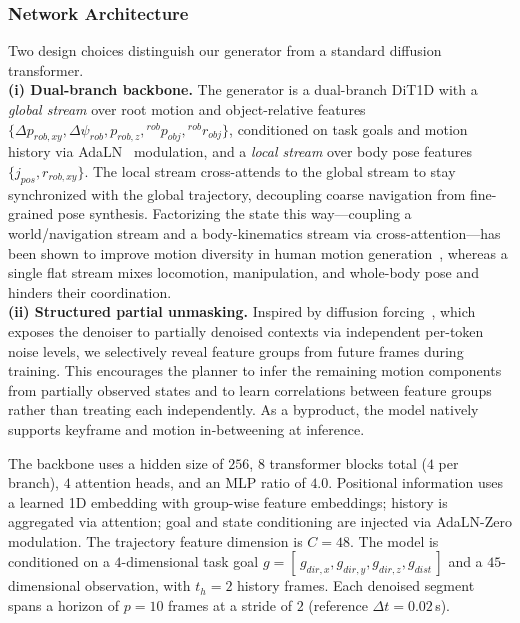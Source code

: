 \documentclass{article}
\begin{document}
\subsubsection{Network Architecture}
\label{app:network_architecture}

Two design choices distinguish our generator from a standard diffusion transformer.\\
\textbf{(i) Dual-branch backbone.} The generator is a dual-branch DiT1D with a \textit{global stream} over root motion and object-relative features $\{\Delta p_{rob,xy}, \Delta\psi_{rob}, p_{rob,z}, {}^{rob}p_{obj}, {}^{rob}r_{obj}\}$, conditioned on task goals and motion history via AdaLN~\cite{peebles2023dit} modulation, and a \textit{local stream} over body pose features $\{j_{pos}, r_{rob,xy}\}$. The local stream cross-attends to the global stream to stay synchronized with the global trajectory, decoupling coarse navigation from fine-grained pose synthesis. Factorizing the state this way---coupling a world/navigation stream and a body-kinematics stream via cross-attention---has been shown to improve motion diversity in human motion generation~\citep{Kimodo2026}, whereas a single flat stream mixes locomotion, manipulation, and whole-body pose and hinders their coordination.\\
\textbf{(ii) Structured partial unmasking.} Inspired by diffusion forcing~\cite{chen2024diffusionforcingnexttokenprediction}, which exposes the denoiser to partially denoised contexts via independent per-token noise levels, we selectively reveal feature groups from future frames during training. This encourages the planner to infer the remaining motion components from partially observed states and to learn correlations between feature groups rather than treating each independently. As a byproduct, the model natively supports keyframe and motion in-betweening at inference.

The backbone uses a hidden size of $256$, $8$ transformer blocks total ($4$ per branch), $4$ attention heads, and an MLP ratio of $4.0$. Positional information uses a learned 1D embedding with group-wise feature embeddings; history is aggregated via attention; goal and state conditioning are injected via AdaLN-Zero modulation. The trajectory feature dimension is $C=48$. The model is conditioned on a $4$-dimensional task goal $g=[\,g_{dir,x}, g_{dir,y}, g_{dir,z}, g_{dist}\,]$ and a $45$-dimensional observation, with $t_h=2$ history frames. Each denoised segment spans a horizon of $p=10$ frames at a stride of $2$ (reference $\Delta t = 0.02$\,s).
\end{document}
